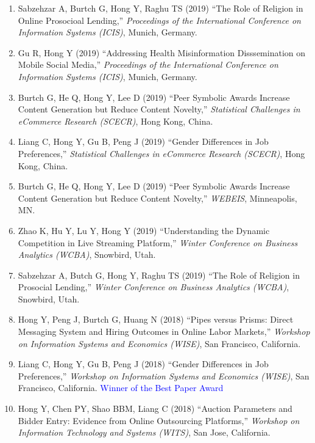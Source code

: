 \documentclass[paper=letter,fontsize=10pt]{scrartcl} %
\newcommand{\ConfEntry}[6]{
		\noindent #1 (#2) ``#3,'' \textit{#4}, #5. \textcolor{blue}{#6}}
\newcommand{\Hong}{Hong Y}
\begin{document}
\begin{enumerate}
\item \ConfEntry{Sabzehzar A, Burtch G, \Hong, Raghu TS}{2019}{The Role of Religion in Online Prosocioal Lending}{Proceedings of the International Conference on Information Systems (ICIS)}{Munich, Germany}{}

\item \ConfEntry{Gu R, \Hong}{2019}{Addressing Health Misinformation Disssemination on Mobile Social Media}{Proceedings of the International Conference on Information Systems (ICIS)}{Munich, Germany}{}

\item \ConfEntry{Burtch G, He Q, \Hong, Lee D}{2019}{Peer Symbolic Awards Increase Content Generation but Reduce Content Novelty}{Statistical Challenges in eCommerce Research (SCECR)}{Hong Kong, China}{}

\item \ConfEntry{Liang C, \Hong, Gu B, Peng J}{2019}{Gender Differences in Job Preferences}{Statistical Challenges in eCommerce Research (SCECR)}{Hong Kong, China}{}

\item \ConfEntry{Burtch G, He Q, \Hong, Lee D}{2019}{Peer Symbolic Awards Increase Content Generation but Reduce Content Novelty}{WEBEIS}{Minneapolis, MN}{}

\item \ConfEntry{Zhao K, Hu Y, Lu Y, \Hong}{2019}{Understanding the Dynamic Competition in Live Streaming Platform}{Winter Conference on Business Analytics (WCBA)}{Snowbird, Utah}{}

\item \ConfEntry{Sabzehzar A, Butch G, \Hong, Raghu TS}{2019}{The Role of Religion in Prosocial Lending}{Winter Conference on Business Analytics (WCBA)}{Snowbird, Utah}{}

\item \ConfEntry{\Hong, Peng J, Burtch G, Huang N}{2018}{Pipes versus Prisms: Direct Messaging System and Hiring Outcomes in Online Labor Markets}{Workshop on Information Systems and Economics (WISE)}{San Francisco, California}{}

\item \ConfEntry{Liang C, \Hong, Gu B, Peng J}{2018}{Gender Differences in Job Preferences}{Workshop on Information Systems and Economics (WISE)}{San Francisco, California}{\protect\newline Winner of the Best Paper Award}

\item \ConfEntry{\Hong, Chen PY, Shao BBM, Liang C}{2018}{Auction Parameters and Bidder Entry: Evidence from Online Outsourcing Platforms}{Workshop on Information Technology and Systems (WITS)}{San Jose, California}{}


\end{enumerate}
\end{document}
